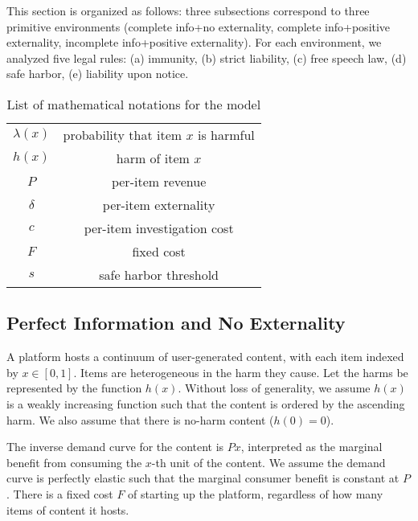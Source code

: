 



This section is organized as follows: three subsections correspond to three primitive environments (complete info+no externality, complete info+positive externality, incomplete info+positive externality). For each environment, we analyzed five legal rules: (a) immunity, (b) strict liability, (c) free speech law, (d) safe harbor, (e) liability upon notice.

\begin{table}[]
    \centering
\begin{tabular}{c|c}
    $\lambda(x)$ & probability that item $x$ is harmful \\
    $h(x)$ & harm of item $x$ \\
    $P$ & per-item revenue \\ %
    $\delta$ & per-item externality \\
    $c$ & per-item investigation cost \\
    $F$ & fixed cost \\
    $s$ & safe harbor threshold
\end{tabular}
\caption{List of mathematical notations for the model}
\end{table}


\subsection{Perfect Information and No Externality}

A platform hosts a continuum of user-generated content, with each item indexed by $x\in[0,1]$. 
Items are heterogeneous in the harm they cause. Let the harms be represented by the function $h(x)$. Without loss of generality, we assume $h(x)$ is a weakly increasing function such that the content is ordered by the ascending harm. We also assume that there is no-harm content ($h(0)=0$).

The inverse demand curve for the content is $Px$, interpreted as the marginal benefit from consuming the $x$-th unit of the content. We assume the demand curve is perfectly elastic such that the marginal consumer benefit is constant at $P$.
There is a fixed cost $F$ of starting up the platform, regardless of how many items of content it hosts.


